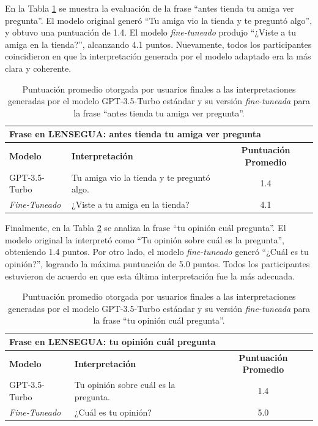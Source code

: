 En la Tabla \ref{tab:R4} se muestra la evaluación de la frase “antes tienda tu amiga ver pregunta”. El modelo original generó “Tu amiga vio la tienda y te preguntó algo”, y obtuvo una puntuación de 1.4. El modelo \textit{fine-tuneado} produjo “¿Viste a tu amiga en la tienda?”, alcanzando 4.1 puntos. Nuevamente, todos los participantes coincidieron en que la interpretación generada por el modelo adaptado era la más clara y coherente.

\vspace{0.5cm}
\begin{table}[H]
\centering
    \begin{tabular}{|l|p{7cm}|c|}
        \hline
        \multicolumn{3}{|l|}{\textbf{Frase en LENSEGUA:} antes tienda tu amiga ver pregunta} \\ \hline \hline
        \textbf{Modelo} & \textbf{Interpretación} & \textbf{Puntuación Promedio} \\ \hline
        GPT-3.5-Turbo & Tu amiga vio la tienda y te preguntó algo. & 1.4 \\ \hline
        \textit{Fine-Tuneado} & ¿Viste a tu amiga en la tienda? & 4.1 \\ \hline
    \end{tabular}
    \caption{Puntuación promedio otorgada por usuarios finales a las interpretaciones generadas por el modelo GPT-3.5-Turbo estándar y su versión \textit{fine-tuneada} para la frase “antes tienda tu amiga ver pregunta”.}
    \label{tab:R4}
\end{table}

Finalmente, en la Tabla \ref{tab:R5} se analiza la frase “tu opinión cuál pregunta”. El modelo original la interpretó como “Tu opinión sobre cuál es la pregunta”, obteniendo 1.4 puntos. Por otro lado, el modelo \textit{fine-tuneado} generó “¿Cuál es tu opinión?”, logrando la máxima puntuación de 5.0 puntos. Todos los participantes estuvieron de acuerdo en que esta última interpretación fue la más adecuada.

\vspace{0.5cm}
\begin{table}[H]
\centering
    \begin{tabular}{|l|p{7cm}|c|}
        \hline
        \multicolumn{3}{|l|}{\textbf{Frase en LENSEGUA:} tu opinión cuál pregunta} \\ \hline \hline
        \textbf{Modelo} & \textbf{Interpretación} & \textbf{Puntuación Promedio} \\ \hline
        GPT-3.5-Turbo & Tu opinión sobre cuál es la pregunta. & 1.4 \\ \hline
        \textit{Fine-Tuneado} & ¿Cuál es tu opinión? & 5.0 \\ \hline
    \end{tabular}
    \caption{Puntuación promedio otorgada por usuarios finales a las interpretaciones generadas por el modelo GPT-3.5-Turbo estándar y su versión \textit{fine-tuneada} para la frase “tu opinión cuál pregunta”.}
    \label{tab:R5}
\end{table}


